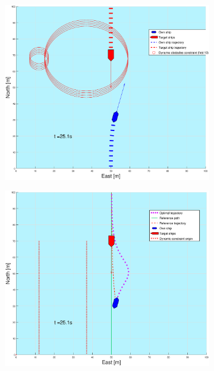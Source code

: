 \begin{figure}[ht!]
\begin{subfigure}[b]{0.499\textwidth}
    \end{subfigure}
    \hfill
    \\
    \begin{subfigure}[b]{0.49\textwidth}
        \centering
        \includegraphics[width=\textwidth]{Images/Figures/enkel_HO/_Simple_0fig1_time=25}
    \end{subfigure}
    \hfill
    \begin{subfigure}[b]{0.499\textwidth}
        \centering
        \includegraphics[width=\textwidth]{Images/Figures/enkel_HO/_Simple_0fig999_time=25}

\end{subfigure}
\end{figure}

